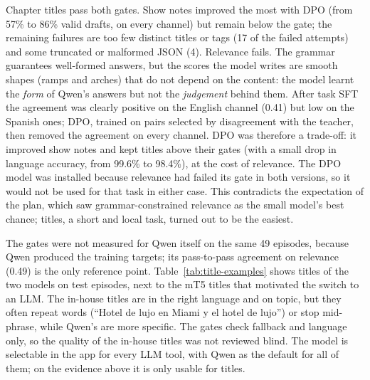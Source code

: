 Chapter titles pass both gates. Show notes improved the most with DPO (from 57\% to 86\% valid drafts, on every channel) but remain below the gate; the remaining failures are too few distinct titles or tags (17 of the failed attempts) and some truncated or malformed JSON (4). Relevance fails. The grammar guarantees well-formed answers, but the scores the model writes are smooth shapes (ramps and arches) that do not depend on the content: the model learnt the \textit{form} of Qwen's answers but not the \textit{judgement} behind them. After task SFT the agreement was clearly positive on the English channel (0.41) but low on the Spanish ones; DPO, trained on pairs selected by disagreement with the teacher, then removed the agreement on every channel. DPO was therefore a trade-off: it improved show notes and kept titles above their gates (with a small drop in language accuracy, from 99.6\% to 98.4\%), at the cost of relevance. The DPO model was installed because relevance had failed its gate in both versions, so it would not be used for that task in either case. This contradicts the expectation of the plan, which saw grammar-constrained relevance as the small model's best chance; titles, a short and local task, turned out to be the easiest.

The gates were not measured for Qwen itself on the same 49 episodes, because Qwen produced the training targets; its pass-to-pass agreement on relevance (0.49) is the only reference point. Table~\ref{tab:title-examples} shows titles of the two models on test episodes, next to the mT5 titles that motivated the switch to an LLM. The in-house titles are in the right language and on topic, but they often repeat words (``Hotel de lujo en Miami y el hotel de lujo'') or stop mid-phrase, while Qwen's are more specific. The gates check fallback and language only, so the quality of the in-house titles was not reviewed blind. The model is selectable in the app for every LLM tool, with Qwen as the default for all of them; on the evidence above it is only usable for titles.

